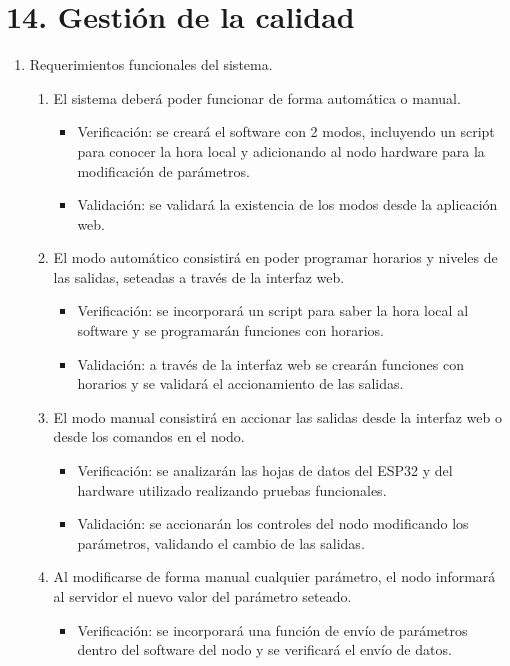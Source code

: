 \documentclass[
11pt, %
]{charter}
\begin{document}
\section{14. Gestión de la calidad}
\label{sec:calidad}

\begin{enumerate}
	\item Requerimientos funcionales del sistema.
		\begin{enumerate}
			\item El sistema deberá poder funcionar de forma automática o manual.
			\begin{itemize}
				\item Verificación: se creará el software con 2 modos, incluyendo un script para conocer la hora local y adicionando al nodo hardware para la modificación de parámetros.
				\item Validación: se validará la existencia de los modos desde la aplicación web.
			\end{itemize}
			\item El modo automático consistirá en poder programar horarios y niveles de las salidas, seteadas a través de la interfaz web.
			\begin{itemize}
				\item Verificación: se incorporará un script para saber la hora local al software y se programarán funciones con horarios.
				\item Validación: a través de la interfaz web se crearán funciones con horarios y se validará el accionamiento de las salidas.
			\end{itemize}
			\item El modo manual consistirá en accionar las salidas desde la interfaz web o desde los comandos en el nodo.
			\begin{itemize}
				\item Verificación: se analizarán las hojas de datos del ESP32 y del hardware utilizado realizando pruebas funcionales.
				\item Validación: se accionarán los controles del nodo modificando los parámetros, validando el cambio de las salidas.
			\end{itemize}
			\item Al modificarse de forma manual cualquier parámetro, el nodo informará al servidor el nuevo valor del parámetro seteado.
			\begin{itemize}
				\item Verificación: se incorporará una función de envío de parámetros dentro del software del nodo y se verificará el envío de datos.

\end{itemize}
\end{enumerate}
\end{enumerate}
\end{document}
